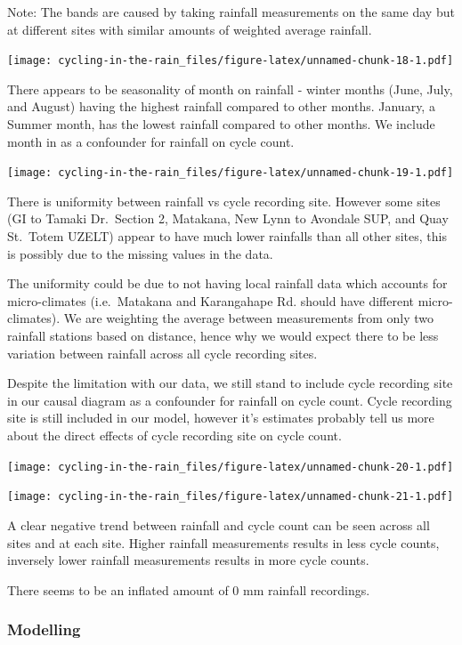 \documentclass[
]{article}
\begin{document}
Note: The bands are caused by taking rainfall measurements on the same
day but at different sites with similar amounts of weighted average
rainfall.

\texttt{[image: cycling-in-the-rain\_files/figure-latex/unnamed-chunk-18-1.pdf]}

There appears to be seasonality of month on rainfall - winter months
(June, July, and August) having the highest rainfall compared to other
months. January, a Summer month, has the lowest rainfall compared to
other months. We include month in as a confounder for rainfall on cycle
count.

\texttt{[image: cycling-in-the-rain\_files/figure-latex/unnamed-chunk-19-1.pdf]}

There is uniformity between rainfall vs cycle recording site. However
some sites (GI to Tamaki Dr.~Section 2, Matakana, New Lynn to Avondale
SUP, and Quay St.~Totem UZELT) appear to have much lower rainfalls than
all other sites, this is possibly due to the missing values in the data.

The uniformity could be due to not having local rainfall data which
accounts for micro-climates (i.e.~Matakana and Karangahape Rd. should
have different micro-climates). We are weighting the average between
measurements from only two rainfall stations based on distance, hence
why we would expect there to be less variation between rainfall across
all cycle recording sites.

Despite the limitation with our data, we still stand to include cycle
recording site in our causal diagram as a confounder for rainfall on
cycle count. Cycle recording site is still included in our model,
however it's estimates probably tell us more about the direct effects of
cycle recording site on cycle count.

\texttt{[image: cycling-in-the-rain\_files/figure-latex/unnamed-chunk-20-1.pdf]}

\texttt{[image: cycling-in-the-rain\_files/figure-latex/unnamed-chunk-21-1.pdf]}

A clear negative trend between rainfall and cycle count can be seen
across all sites and at each site. Higher rainfall measurements results
in less cycle counts, inversely lower rainfall measurements results in
more cycle counts.

There seems to be an inflated amount of 0 mm rainfall recordings.

\hypertarget{modelling}{%
\subsubsection{Modelling}\label{modelling}}
\end{document}
